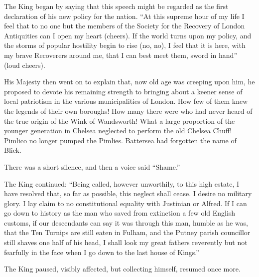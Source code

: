 \documentclass{book}
\begin{document}
The King began by saying that this speech might be regarded as the first declaration of his new policy for the nation. “At this supreme hour of my life I feel that to no one but the members of the Society for the Recovery of London Antiquities can I open my heart (cheers). If the world turns upon my policy, and the storms of popular hostility begin to rise (no, no), I feel that it is here, with my brave Recoverers around me, that I can best meet them, sword in hand” (loud cheers).

His Majesty then went on to explain that, now old age was creeping upon him, he proposed to devote his remaining strength to bringing about a keener sense of local patriotism in the various municipalities of London. How few of them knew the legends of their own boroughs! How many there were who had never heard of the true origin of the Wink of Wandsworth! What a large proportion of the younger generation in Chelsea neglected to perform the old Chelsea Chuff! Pimlico no longer pumped the Pimlies. Battersea had forgotten the name of Blick.

There was a short silence, and then a voice said “Shame.”

The King continued: “Being called, however unworthily, to this high estate, I have resolved that, so far as possible, this neglect shall cease. I desire no military glory. I lay claim to no constitutional equality with Justinian or Alfred. If I can go down to history as the man who saved from extinction a few old English customs, if our descendants can say it was through this man, humble as he was, that the Ten Turnips are still eaten in Fulham, and the Putney parish councillor still shaves one half of his head, I shall look my great fathers reverently but not fearfully in the face when I go down to the last house of Kings.”

The King paused, visibly affected, but collecting himself, resumed once more.
\end{document}
